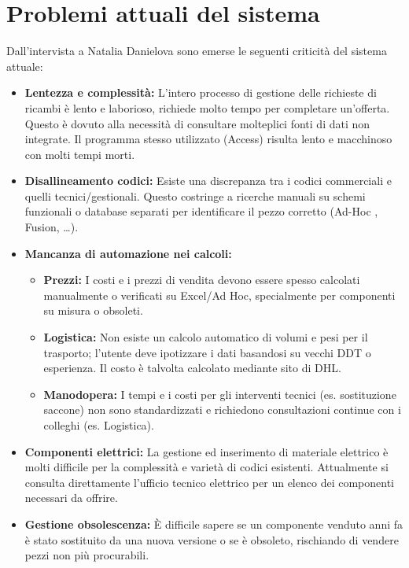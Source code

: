 \documentclass[12pt, a4paper]{article} %
\begin{document}
\section{Problemi attuali del sistema}
Dall'intervista a Natalia Danielova sono emerse le seguenti criticità del sistema attuale:
\begin{itemize}
      \item \textbf{Lentezza e complessità:} L'intero processo di gestione delle richieste di ricambi è lento e laborioso, richiede molto tempo per completare un'offerta.
            Questo è dovuto alla necessità di consultare molteplici fonti di dati non integrate. Il programma stesso utilizzato (Access) risulta lento e macchinoso con molti tempi morti.
      \item \textbf{Disallineamento codici:} Esiste una discrepanza tra i codici commerciali e quelli tecnici/gestionali. Questo costringe a ricerche manuali
            su schemi funzionali o database separati per identificare il pezzo corretto (Ad-Hoc , Fusion,  \dots).
      \item \textbf{Mancanza di automazione nei calcoli:}
            \begin{itemize}
                  \item \textbf{Prezzi:} I costi e i prezzi di vendita devono essere spesso calcolati manualmente o verificati su Excel/Ad Hoc, specialmente per componenti su misura o obsoleti.
                  \item \textbf{Logistica:} Non esiste un calcolo automatico di volumi e pesi per il trasporto; l'utente deve ipotizzare i dati basandosi su vecchi DDT o esperienza.
                        Il costo è talvolta calcolato mediante sito di DHL.
                  \item \textbf{Manodopera:} I tempi e i costi per gli interventi tecnici (es. sostituzione saccone) non sono standardizzati e richiedono consultazioni continue con i colleghi (es. Logistica).
            \end{itemize}
      \item \textbf{Componenti elettrici:} La gestione ed inserimento di materiale elettrico è molti difficile per la complessità e varietà di codici esistenti.
            Attualmente si consulta direttamente l'ufficio tecnico elettrico per un elenco dei componenti necessari da offrire.
      \item \textbf{Gestione obsolescenza:} È difficile sapere se un componente venduto anni fa è stato sostituito da una nuova versione o se è obsoleto, rischiando di vendere pezzi non più procurabili.

\end{itemize}
\end{document}
